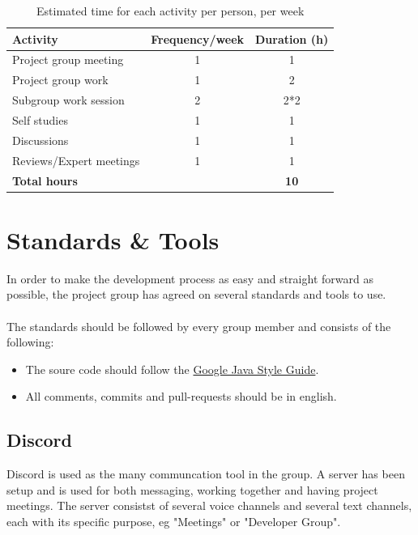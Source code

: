 \documentclass{article}
\begin{document}
        \begin{table}[h]
            \centering
            \begin{tabular}{|l|c|c|}
                \hline
                    \textbf{Activity} & \textbf{Frequency/week} & \textbf{Duration (h)} \\
                \hline
                    Project group meeting & 1 & 1 \\
                 \hline
                    Project group work & 1 & 2 \\
                 \hline
                    Subgroup work session & 2 & 2*2 \\
                 \hline
                    Self studies & 1  & 1 \\
                 \hline
                    Discussions & 1 & 1 \\
                 \hline
                    Reviews/Expert meetings & 1 & 1 \\
                 \hline
                    \textbf{Total hours} & & \textbf{10} \\
                 \hline
            \end{tabular}
            \caption{Estimated time for each activity per person, per week}
            \label{activitytable}
        \end{table}
    

\section{Standards \& Tools}    %
    In order to make the development process as easy and straight forward as possible,
    the project group has agreed on several standards and tools to use. 
    \\ \\
    The standards should be followed by every group member and consists of the following:
    \begin{itemize}
        \item The soure code should follow the
        \href{https://google.github.io/styleguide/javaguide.html}{Google Java Style Guide}.
        \item All comments, commits and pull-requests should be in english.
    \end{itemize}
    
    \subsection{Discord}
    Discord is used as the many communcation tool in the group. A server has been setup and is
    used for both messaging, working together and having project meetings.
    The server consistst of several voice channels and several text channels, each
    with its specific purpose, eg "Meetings" or "Developer Group".
    
\end{document}
